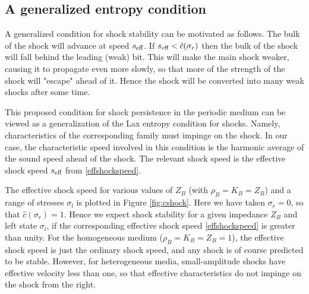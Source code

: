 \subsection{A generalized entropy condition}
A generalized condition for shock stability can be motivated as follows.
The bulk of the shock will advance at speed $s_\textup{eff}$.  If 
$s_\textup{eff}<\hat{c}(\sigma_r)$ then the bulk of the shock will fall behind
the leading (weak) bit.  This will make the main shock weaker, causing it to 
propagate even more slowly, so that more of the strength of the shock will
"escape" ahead of it.  Hence the shock will be converted
into many weak shocks after some time.  

This proposed condition for shock persistence in the periodic medium can be 
viewed as a generalization of the Lax entropy condition for shocks.  Namely, 
characteristics of the corresponding family must impinge on the shock.
In our case, the characteristic speed involved in this condition is the
harmonic average of the sound speed ahead of the shock.
The relevant shock speed is the effective shock speed $s_\textup{eff}$ 
from \eqref{effshockspeed}.

The effective shock speed for various values of $Z_B$ (with $\rho_B=K_B=Z_B$)
and a range of stresses 
$\sigma_l$ is plotted in Figure \ref{fig:cshock}.  Here we have taken
$\sigma_r=0$, so that $\hat{c}(\sigma_r)=1$.  Hence we expect shock stability
for a given impedance $Z_B$ and left state $\sigma_l$, if the corresponding 
effective shock speed \eqref{effshockspeed}
is greater than unity.
For the homogeneous medium ($\rho_B=K_B=Z_B=1$),
the effective shock speed is just the ordinary shock speed, and any shock 
is of course predicted to be stable.  However, for heterogeneous media, 
small-amplitude shocks have effective velocity less than one, 
so that effective characteristics do not impinge on the shock from the right.


